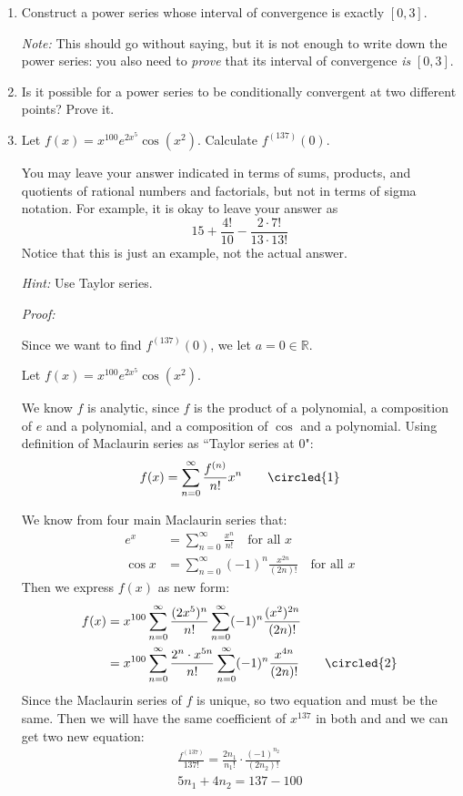 \documentclass[12pt]{exam}
\newcommand {\DS} [1] {${\displaystyle #1}$}
\newcommand{\R}{\mathbb{R}}
\begin{document}
\begin{enumerate}

\item Construct a power series whose interval of convergence is exactly \DS{[0,3]}. 

\emph{Note:}  This should go without saying, but it is not enough to write down the power series: you also need to \emph{prove} that its interval of convergence \emph{is} \DS{[0,3].}

\item Is it possible for a power series to be conditionally convergent at two different points?  Prove it.

\item Let \DS{f(x) = x^{100} e^{2x^5} \cos ( x^2) }.  Calculate \DS{f^{(137)}(0)}.   

You may leave your answer indicated in terms of sums, products, and quotients of rational numbers and factorials, but not in terms of sigma notation.  For example, it is okay to leave your answer as
	$$
		 15 + \frac{4!}{10} - \frac{2 \cdot 7!}{13 \cdot 13!}
	$$ 
Notice that this is just an example, not the actual answer.	

\emph{Hint:}  Use Taylor series.  

\emph{Proof:}

Since we want to find $f^{(137)}(0)$, we let $a=0\in\R$.

Let $f(x) = x^{100} e^{2x^5} \cos ( x^2)$.

We know $f$ is analytic, since $f$ is the product of a polynomial, a composition of $e$ and a polynomial, and a composition of $\cos$ and a polynomial. Using definition of Maclaurin series as ``Taylor series at $0$":
$$
    f(x)=\sum_{n=0}^\infty \frac{f^{(n)}}{n!}x^n \qquad\circled{1}
$$

We know from four main Maclaurin series that:
\begin{align*}
    e^x &= \sum_{n=0}^\infty \frac{x^n}{n!}\quad\mbox{for all }x\\
    \cos x &= \sum_{n=0}^\infty  (-1)^n\frac{x^{2n}}{(2n)!}\quad\mbox{for all }x
\end{align*}
Then we express $f(x)$ as new form:
\begin{align*}
    f(x) &= x^{100}\sum_{n=0}^\infty \frac{(2x^5)^n}{n!}\sum_{n=0}^\infty  (-1)^n\frac{(x^2)^{2n}}{(2n)!} \\
    &= x^{100}\sum_{n=0}^\infty \frac{2^n\cdot x^{5n}}{n!}\sum_{n=0}^\infty  (-1)^n\frac{x^{4n}}{(2n)!} \qquad\circled{2}
\end{align*}
Since the Maclaurin series of $f$ is unique, so two equation  and  must be the same. Then we will have the same coefficient of $x^{137}$ in both  and  and we can get two new equation:
\begin{align*}
    \frac{f^{(137)}}{137!}=\frac{2n_1}{n_1!}\cdot\frac{(-1)^{n_2}}{(2n_2)!}\\
    5n_1+4n_2=137-100
\end{align*}


\end{enumerate}
\end{document}
